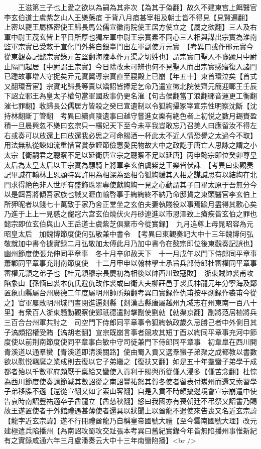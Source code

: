 　　王滋第三子也上愛之欲以為嗣為其非次【為其于偽翻】故久不建東宫上餌醫官李玄伯道士虞紫芝山人王樂藥疽于背八月疽甚宰相及朝士皆不得見【見賢遍翻】上密以夔王屬樞密使王歸長馬公儒宣徽南院使王居方使立之【屬之欲翻】三人及右軍中尉王茂玄皆上平日所厚也獨左軍中尉王宗實素不同心三人相與謀出宗實為淮南監軍宗實已受敕于宣化門外將自銀臺門出左軍副使亓元實　【考異曰或作邢元實今從東觀奏記懿宗實錄亓苦堅翻海陵本作亓渠之切姓也】謂宗實曰聖人不豫踰月中尉止隔門起居【中尉謂王宗實】今日除改未可辨也何不見聖人而出宗實感寤復入諸門已踵故事增人守捉矣亓元實翼導宗實直至寢殿上已崩【年五十】東首環泣矣【首式又翻環音宦】宗實叱歸長等責以矯詔皆捧足乞命乃遣宣徽北院使齊元簡迎鄆王壬辰下詔立鄆王為皇太子權句當軍國政事仍更名漼【句古侯翻當丁浪翻鄆音運更工衡翻漼七罪翻】收歸長公儒居方皆殺之癸巳宣遺制以令狐綯攝冢宰宣宗性明察沈斷【沈持林翻斷丁管翻　考異曰續貞陵遺事曰越守嘗進女樂有絶色者上初悦之數月錫賚盈積一旦晨興忽不樂曰玄宗只一楊妃天下至今未平我豈敢忘乃召美人曰應留汝不得左右或奏可以放還上曰放還我必思之可命賜酒一杯此太不近人情恐譽之太過今不取】用法無私從諫如流重惜官賞恭謹節儉惠愛民物故大中之政訖于唐亡人思詠之謂之小太宗【衛嗣君之聰察不足以延衛唐宣宗之聰察不足以延唐】丙申懿宗即位癸卯尊皇太后為太皇太后以王宗實為驃騎上將軍李玄伯虞紫芝王樂皆伏誅　【考異曰東觀奏記畢諴在翰林上恩顧特異許用為相深為丞相令狐綯緩其入相之謀諴思有以結綯在北門求得絶色非人世所有盛飾珠翠專使獻綯綯一見之心動謂其子曰畢太原于吾無分今以是餌吾將傾吾家族也諴又瀝血輸啓事于綯綯終不納乃命邸貨之東頭醫官李玄伯上所狎昵者以錢七十萬致于家乃舍正堂坐之玄伯夫妻執賤役以事焉踰月盡得其歡心矣乃進于上上一見惑之寵冠六宫玄伯燒伏火丹砂連進以市恩澤致上瘡疾皆玄伯之罪也懿宗即位玄伯與山人王岳道士虞紫芝俱棄市今從實録】　九月追尊上母晁昭容為元昭皇太后　加魏博節度使何弘敬兼中書令　【考異曰東觀奏記大中十三年魏博何弘敬就加中書令據實録二月弘敬加太傅此月乃加中書令在懿宗即位後東觀奏記誤也】幽州節度使張允伸同平章事　冬十月辛卯赦天下　十一月戊午以門下侍郎同平章事蕭鄴同平章事充荆南節度使　十二月甲申以翰林學士承旨兵部侍郎杜審權同平章事審權元頴之弟子也【杜元穎穆宗長慶初為相後以帥西川致寇敗】　浙東賊帥裘甫攻陷象山【孫愐曰裘本仇氏避仇改作裘或曰衛大夫柳莊邑于裘氏神龍元年分寧海及鄮置象山縣屬台州廣德二年度屬明州帥所類翻考異曰實録作仇甫按平剡録作裘甫今從之】官軍屢敗明州城門晝閉進逼剡縣【剡漢古縣唐屬越州九域志在州東南一百八十里】有衆百人浙東騷動觀察使鄭祇德遣討擊副使劉勍【勍渠京翻】副將范居植將兵三百合台州軍共討之　司空門下侍郎同平章事令狐綯執政歲久忌勝己者中外側目其子滈頗招權受賄【滈胡老翻】宣宗既崩言事者競攻其短丁酉以綯同平章事充河中節度使以前荆南節度使同平章事白敏中守司徒兼門下侍郎同平章事　初韋臯在西川開青溪道以通羣蠻【青溪道即清溪關路】使由蜀入貢又選羣蠻子弟聚之成都教以書數欲以慰悦羈縻之業成則去復以它子弟繼之【復扶又翻】如是五十年羣蠻子弟學于成都者殆以千數軍府頗厭于稟給又蠻使入貢利于賜與所從傔人浸多【傔苦念翻】杜悰為西川節度使奏請節減其數詔從之南詔豐祐怒其賀冬使者留表付嶲州而還又索習學子弟移牒不遜【還從宣翻又如字索山客翻】自是入貢不時頗擾邊境會宣宗崩遣中使告哀時南詔豐祐適卒子酋龍立【酋慈秋翻】怒曰我國亦有喪朝廷不弔祭又詔書乃賜故王遂置使者于外館禮遇甚薄使者還具以狀聞上以酋龍不遣使來告喪又名近玄宗諱【龍字近玄宗諱】遂不行冊禮酋龍乃自稱皇帝國號大禮【至今雲南國號大理】改元建極遣兵陷播州【為南詔攻蜀攻交趾張本考異曰舊紀實錄今年皆無陷播州事惟新紀有之實錄咸通六年三月盧潘奏云大中十三年南蠻陷播】<br />
